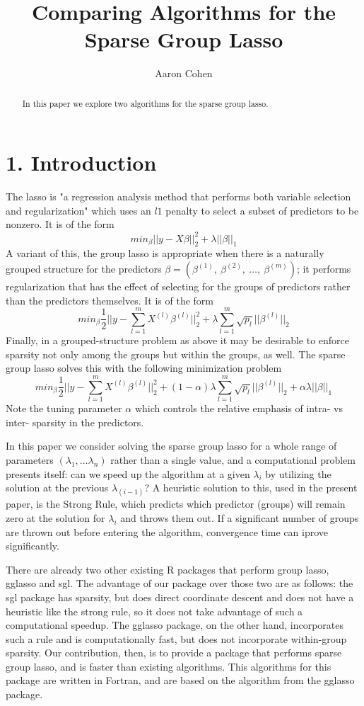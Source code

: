 \documentclass[titlepage]{article}
\title{Comparing Algorithms for the Sparse Group Lasso}
\author{Aaron Cohen}
\begin{document}
    \maketitle
    \begin{abstract}
        In this paper we explore two algorithms for the sparse group lasso. 
    \end{abstract}

\section{1. Introduction}
The lasso is "a regression analysis method that performs both variable selection and regularization" which uses an $l1$ penalty to select a subset of predictors to be nonzero. It is of the form 
\[
min_{\beta} ||y-X\beta||_2^2 + \lambda ||\beta||_1
\]
A variant of this, the group lasso is appropriate when there is a naturally grouped structure for the predictors $\beta = (\beta^{(1)},\ \beta^{(2)},\ \dots, \ \beta^{(m)})$; it performs regularization that has the effect of selecting for the groups of predictors rather than the predictors themselves. It is of the form 
\[
min_{\beta}\frac{1}{2}||y-\sum_{l=1}^mX^{(l)}\beta^{(l)}||_2^2 + \lambda\sum_{l=1}^m\sqrt{p_l}||\beta^{(l)}||_2
\]
Finally, in a grouped-structure problem as above it may be desirable to enforce sparsity not only among the groups but within the groups, as well. The sparse group lasso solves this with the following minimization problem
\[
min_{\beta}\frac{1}{2}||y-\sum_{l=1}^mX^{(l)}\beta^{(l)}||_2^2 + (1-\alpha)\lambda\sum_{l=1}^m\sqrt{p_l}||\beta^{(l)}||_2+\alpha\lambda||\beta||_1
\]
Note the tuning parameter $\alpha$ which controls the relative emphasis of intra- vs inter- sparsity in the predictors.

In this paper we consider solving the sparse group lasso for a whole range of parameters $(\lambda_1,\dots \lambda_n)$ rather than a single value, and a computational problem presents itself:  can we speed up the algorithm at a  given $\lambda_i$ by utilizing the solution at the previous $\lambda_{(i-1)}$? A heuristic solution to this, used in the present paper, is the Strong Rule, which predicts which predictor (groups) will remain zero at the solution for $\lambda_i$ and throws them out. If a significant number of groups are thrown out before entering the algorithm, convergence time can iprove significantly.

There are already two other existing R packages that perform group lasso, gglasso and sgl. The advantage of our package over those two are as follows: the sgl package has sparsity, but does direct coordinate descent and does not have a heuristic like the strong rule, so it does not take advantage of such a computational speedup. The gglasso package, on the other hand, incorporates such a rule and is computationally fast, but does not incorporate within-group sparsity. Our contribution, then, is to provide a package that performs sparse group lasso, and is faster than existing algorithms. This algorithms for this package are written in Fortran, and are based on the algorithm from the gglasso package.
\end{document}
